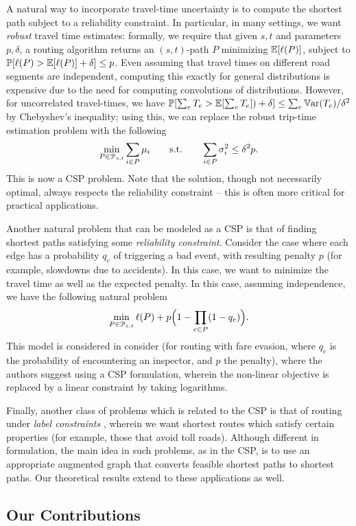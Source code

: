 A natural way to incorporate travel-time uncertainty is to compute the shortest path subject to a reliability constraint.
In particular, in many settings, we want \emph{robust} travel time estimates: formally, we require that given $s,t$ and parameters $p,\delta$, a routing algorithm returns an $(s,t)$-path $P$ minimizing $\mathbb{E}[\ell(P)]$, subject to $\mathbb{P}[\ell(P)>\mathbb{E}[\ell(P)]+\delta]\leq p$.
Even assuming that travel times on different road segments are independent, computing this exactly for general distributions is expensive due to the need for computing convolutions of distributions. However, for uncorrelated travel-times, we have $\mathbb{P}[\sum_eT_e>\mathbb{E}[\sum_eT_e])+\delta]\leq \sum_e\mathbb{V}\textnormal{ar}(T_e)/\delta^2$ by Chebyshev's inequality; using this, we can replace the robust trip-time estimation problem with the following
\[
\min_{ P\in\mathcal{P}_{s,t}}\sum_{i\in P}\mu_i \qquad \text{s.t.}\qquad \sum_{i\in P}\sigma^2_i\leq \delta^2p.
\]
This is now a CSP problem. Note that the solution, though not necessarily optimal, always respects the reliability constraint -- this is often more critical for practical applications.


Another natural problem that can be modeled as a CSP is that of finding shortest paths satisfying some \emph{reliability constraint}.
Consider the case where each edge has a probability $q_e$ of triggering a bad event, with resulting penalty $p$ (for example, slowdowns due to accidents).
In this case, we want to minimize the travel time as well as the expected penalty.
In this case, assuming independence, we have the following natural problem
\[
\min_{P\in\mathcal{P}_{s,t}} \ell(P)+p\Bigl(1-\prod_{e\in P}(1-q_e)\Bigr).
\]
This model is considered in \citet{fareevasion} consider (for routing with fare evasion, where $q_e$ is the probability of encountering an inspector, and $p$ the penalty), where the authors suggest using a CSP formulation, wherein the non-linear objective is replaced by a linear constraint by taking logarithms.

Finally, another class of problems which is related to the CSP is that of routing under \emph{label constraints} \cite{language_csp,rice_csp}, wherein we want shortest routes which satisfy certain properties (for example, those that avoid toll roads). Although different in formulation, the main idea in such problems, as in the CSP, is to use an appropriate augmented graph that converts feasible shortest paths to shortest paths. Our theoretical results extend to these applications as well.

\subsection{Our Contributions}

